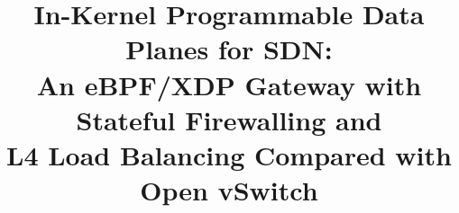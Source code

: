\documentclass[conference]{IEEEtran}
\begin{document}
\title{In-Kernel Programmable Data Planes for SDN:\\
An eBPF/XDP Gateway with Stateful Firewalling and\\
L4 Load Balancing Compared with Open vSwitch}


\maketitle
\end{document}
